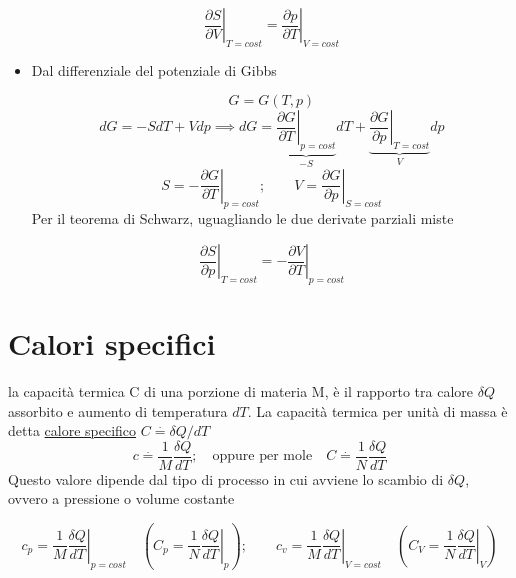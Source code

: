 \documentclass[a4paper,11pt]{report}
\newcommand{\defeq}{\overset{\cdot}{=}}
\begin{document}
\begin{itemize}
		\begin{equation}
		\left.\dfrac{\partial S}{\partial V}\right|_{T=cost} = \left.\dfrac{\partial p}{\partial T}\right|_{V=cost}
		\end{equation}
		
		\item Dal differenziale del potenziale di Gibbs
		
		$$
		G=G(T,p)
		$$
		$$
		dG = - SdT + Vdp \implies dG =\underset{-S}{ \underbrace{\left.\dfrac{\partial G}{\partial T}\right|_{p=cost}}}dT +  \underset{V}{\underbrace{\left.\dfrac{\partial G}{\partial p}\right|_{T=cost}}}dp
		$$
		$$
		S= -\left.\dfrac{\partial G}{\partial T}\right|_{p=cost}; 
		\qquad
		V= \left.\dfrac{\partial G}{\partial p}\right|_{S=cost}
		$$
		Per il teorema di Schwarz, uguagliando le due derivate parziali miste
		
		\begin{equation}
		\left.\dfrac{\partial S}{\partial p}\right|_{T=cost} = - \left.\dfrac{\partial V}{\partial T}\right|_{p=cost}
		\end{equation}
		
		\end{itemize}
	
	\section{Calori specifici}
		la capacità termica C di una porzione di materia M, è il rapporto tra calore $\delta Q$ assorbito e aumento di temperatura $dT$. La capacità termica per unità di massa è detta \underline{calore specifico} $C \defeq \delta Q/ dT$
		$$
		c \defeq \dfrac{1}{M}\dfrac{\delta Q}{d T}; \quad \textrm{oppure per mole} \quad C \defeq \dfrac{1}{N}\dfrac{\delta Q}{d T}
		$$
		Questo valore dipende dal tipo di processo in cui avviene lo scambio di $\delta Q$, ovvero a pressione o volume costante
		
		$$
		c_p = \left.\dfrac{1}{M}\dfrac{\delta Q}{d T}\right|_{p=cost} \quad \left( C_p = \left.\dfrac{1}{N}\dfrac{\delta Q}{d T}\right|_{p} \right); \qquad c_v=  \left.\dfrac{1}{M}\dfrac{\delta Q}{d T}\right|_{V=cost} \quad  \left( C_V = \left.\dfrac{1}{N}\dfrac{\delta Q}{d T}\right|_{V} \right)
		$$
		
\end{document}
